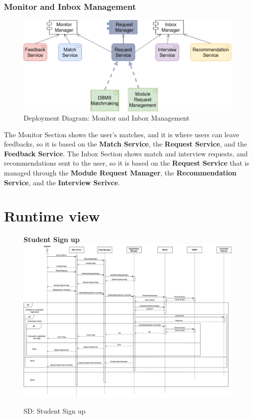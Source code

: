 \subsubsection{Monitor and Inbox Management}
\begin{figure}[H]
    \centering
    \includegraphics[width=0.65\linewidth]{images/architectural design/deployment/depl-requ.drawio.png}
    \caption{Deployment Diagram: Monitor and Inbox Management}
\end{figure}
The Monitor Section shows the user's matches, and it is where users can leave feedbacks, so it is based on the \textbf{Match Service}, the \textbf{Request Service}, and the \textbf{Feedback Service}.
The Inbox Section shows match and interview requests, and recommendations sent to the user, so it is based on the \textbf{Request Service} that is managed through the \textbf{Module Request Manager}, the \textbf{Recommendation Service}, and the \textbf{Interview Serivce}. 
\section{Runtime view}
\begin{figure}[H]
\textbf{Student Sign up}\newline\newline
\includegraphics[width=15cm]{images/architectural design/runtime/DD-UC1.drawio (1).png}
    \caption{SD: Student Sign up}
\end{figure}

